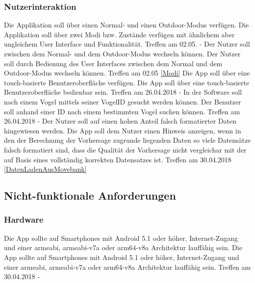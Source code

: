 \documentclass[12pt]{article} %
\begin{document}
\subsubsection{Nutzerinteraktion}

\begin{requirements}[ref={(R\arabic*)},label=(R\arabic*),resume]
{
 Die Applikation soll über einen Normal- und einen Outdoor-Modus verfügen. 
 }{
 Die Applikation soll über zwei Modi bzw. Zustände verfügen mit ähnlichem aber ungleichem User Interface und Funktionalität. 
 }{
 Treffen am 02.05.
 }{
 - 
}
{
 Der Nutzer soll zwischen dem Normal- und dem Outdoor-Modus wechseln können. 
 }{
 Der Nutzer soll durch Bedienung des User Interfaces zwischen dem Normal und dem Outdoor-Modus wechseln können. 
 }{
 Treffen am 02.05 
 }{
 \ref{Modi} 
}
{
 Die App soll über eine touch-basierte Benutzeroberfläche verfügen. 
 }{
 Die App soll über eine touch-basierte Benutzeroberfläche bedienbar sein. 
 }{
 Treffen am 26.04.2018 
 }{
 - 
}
{
 In der Software soll nach einem Vogel mittels seiner VogelID gesucht werden können.
 }{
 Der Benutzer soll anhand einer ID nach einem bestimmten Vogel suchen können.
 }{
 Treffen am 26.04.2018
 }{
 -
}
{
 Der Nutzer soll auf einen hohen Anteil falsch formatierter Daten hingewiesen werden. 
 }{
 Die App soll dem Nutzer einen Hinweis anzeigen, wenn in den der Berechnung der Vorhersage zugrunde liegenden Daten so viele Datensätze falsch formatiert sind, dass die Qualität der Vorhersage nicht vergleichar mit der auf Basis eines vollständig korrekten Datensatzes ist.
 }{
 Treffen am 30.04.2018 
 }{
 \ref{DatenLadenAusMovebank} 
}
\end{requirements}

\subsection{Nicht-funktionale Anforderungen}

\subsubsection{Hardware}

\begin{requirements}[ref={(R\arabic*)},label=(R\arabic*),resume]
{
 Die App sollte auf Smartphones mit Android 5.1 oder höher, Internet-Zugang und einer armeabi, armeabi-v7a oder arm64-v8a Architektur lauffähig sein. 
 }{
 Die App sollte auf Smartphones mit Android 5.1 oder höher, Internet-Zugang und einer armeabi, armeabi-v7a oder arm64-v8a Architektur lauffähig sein. 
 }{
 Treffen am 30.04.2018 
 }{
 - 
}
\end{requirements}
\end{document}
